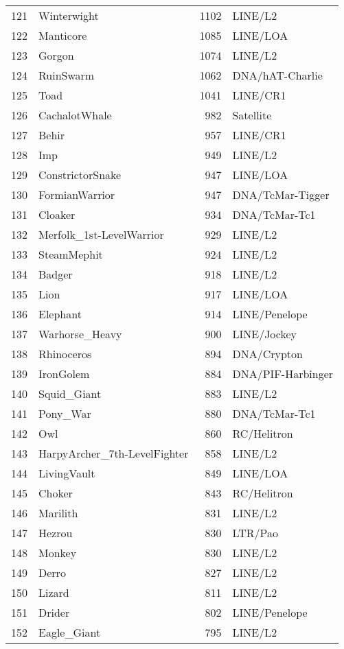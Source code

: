 \begin{table}[ht]
\begin{tabular}{rlrl}
  121 & Winterwight & 1102 & LINE/L2  \\ 
  122 & Manticore & 1085 & LINE/LOA  \\ 
  123 & Gorgon & 1074 & LINE/L2  \\ 
  124 & RuinSwarm & 1062 & DNA/hAT-Charlie  \\ 
  125 & Toad & 1041 & LINE/CR1  \\ 
  126 & CachalotWhale & 982 & Satellite  \\ 
  127 & Behir & 957 & LINE/CR1  \\ 
  128 & Imp & 949 & LINE/L2  \\ 
  129 & ConstrictorSnake & 947 & LINE/LOA  \\ 
  130 & FormianWarrior & 947 & DNA/TcMar-Tigger  \\ 
  131 & Cloaker & 934 & DNA/TcMar-Tc1  \\ 
  132 & Merfolk\_1st-LevelWarrior & 929 & LINE/L2  \\ 
  133 & SteamMephit & 924 & LINE/L2  \\ 
  134 & Badger & 918 & LINE/L2  \\ 
  135 & Lion & 917 & LINE/LOA  \\ 
  136 & Elephant & 914 & LINE/Penelope  \\ 
  137 & Warhorse\_Heavy & 900 & LINE/Jockey  \\ 
  138 & Rhinoceros & 894 & DNA/Crypton  \\ 
  139 & IronGolem & 884 & DNA/PIF-Harbinger  \\ 
  140 & Squid\_Giant & 883 & LINE/L2  \\ 
  141 & Pony\_War & 880 & DNA/TcMar-Tc1  \\ 
  142 & Owl & 860 & RC/Helitron  \\ 
  143 & HarpyArcher\_7th-LevelFighter & 858 & LINE/L2  \\ 
  144 & LivingVault & 849 & LINE/LOA  \\ 
  145 & Choker & 843 & RC/Helitron  \\ 
  146 & Marilith & 831 & LINE/L2  \\ 
  147 & Hezrou & 830 & LTR/Pao  \\ 
  148 & Monkey & 830 & LINE/L2  \\ 
  149 & Derro & 827 & LINE/L2  \\ 
  150 & Lizard & 811 & LINE/L2  \\ 
  151 & Drider & 802 & LINE/Penelope  \\ 
  152 & Eagle\_Giant & 795 & LINE/L2  \\ 

\end{tabular}
\end{table}
